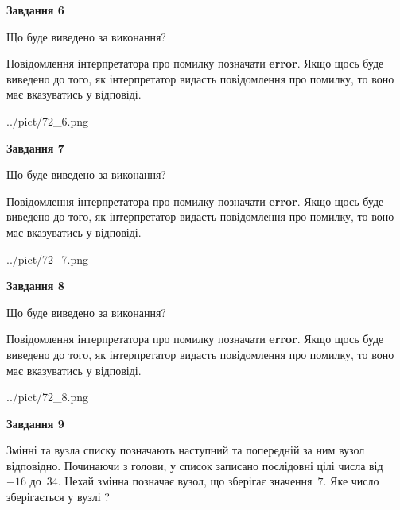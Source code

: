 \documentclass[12pt, ukrainian]{article}
\begin{document}
{\begin {large}
{\begin {center}\textbf{Завдання 6}\end {center}}\par
Що буде виведено за виконання?

Повідомлення інтерпретатора про помилку позначати \textbf{error}.
Якщо щось буде виведено до того, як інтерпретатор видасть повідомлення про помилку, 
то воно має вказуватись у відповіді. \par


\begin{center}
	{../pict/72_6.png}
\end{center}
\newpage

{\begin {center}\textbf{Завдання 7}\end {center}}\par
Що буде виведено за виконання?

Повідомлення інтерпретатора про помилку позначати \textbf{error}.
Якщо щось буде виведено до того, як інтерпретатор видасть повідомлення про помилку, 
то воно має вказуватись у відповіді. \par


\begin{center}
	{../pict/72_7.png}
\end{center}
\newpage

{\begin {center}\textbf{Завдання 8}\end {center}}\par
Що буде виведено за виконання?

Повідомлення інтерпретатора про помилку позначати \textbf{error}.
Якщо щось буде виведено до того, як інтерпретатор видасть повідомлення про помилку, 
то воно має вказуватись у відповіді. \par


\begin{center}
	{../pict/72_8.png}
\end{center}
\newpage

{\begin {center}\textbf{Завдання 9}\end {center}}\par
Змінні  та  вузла списку позначають наступний та попередній за ним вузол відповідно. Починаючи з голови, у список записано послідовні цілі числа від~$-16$ до~$34$. Нехай змінна  позначає вузол, що зберігає значення~$7$.
Яке число зберігається у вузлі  ?\par
\newpage


\end{large}}
\end{document}

